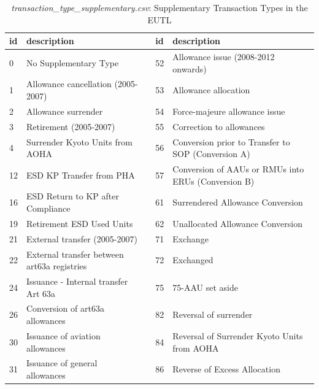 \documentclass[authoryear]{elsarticle}
\begin{document}
\begin{table}[htbp]\scriptsize
	\caption{\textit{transaction\_type\_supplementary.csv}: Supplementary Transaction Types in the EUTL}\label{tab:transTypesSup}
	\centering
	\begin{tabular*}{\textwidth}{@{}@{\extracolsep{\fill}} lp{4cm}clp{3cm} @{}}
		\toprule
		\toprule
		\textbf{id} & \textbf{description} &       & \multicolumn{1}{l}{\textbf{id}} & \multicolumn{1}{l}{\textbf{description}} \\
		\midrule
		0     & No Supplementary Type &       & 52    & \multicolumn{1}{l}{Allowance issue (2008-2012 onwards)} \\
		1     & Allowance cancellation (2005-2007) &       & 53    & \multicolumn{1}{l}{Allowance allocation} \\
		2     & Allowance surrender &       & 54    & \multicolumn{1}{l}{Force-majeure allowance issue} \\
		3     & Retirement (2005-2007) &       & 55    & \multicolumn{1}{l}{Correction to allowances} \\
		4     & Surrender Kyoto Units from AOHA &       & 56    & \multicolumn{1}{l}{Conversion prior to Transfer to SOP (Conversion A)} \\
		12    & ESD KP Transfer from PHA &       & 57    & \multicolumn{1}{l}{Conversion of AAUs or RMUs into ERUs (Conversion B)} \\
		16    & ESD Return to KP after Compliance &       & 61    & \multicolumn{1}{l}{Surrendered Allowance Conversion} \\
		19    & Retirement ESD Used Units &       & 62    & \multicolumn{1}{l}{Unallocated Allowance Conversion} \\
		21    & External transfer (2005-2007) &       & 71    & \multicolumn{1}{l}{Exchange} \\
		22    & External transfer between art63a registries &       & 72    & \multicolumn{1}{l}{Exchanged} \\
		24    & Issuance - Internal transfer Art 63a &       & 75    & \multicolumn{1}{l}{75-AAU set aside} \\
		26    & Conversion of art63a allowances &       & 82    & \multicolumn{1}{l}{Reversal of surrender} \\
		30    & Issuance of aviation allowances &       & 84    & \multicolumn{1}{l}{Reversal of Surrender Kyoto Units from AOHA} \\
		31    & Issuance of general allowances &       & 86    & \multicolumn{1}{l}{Reverse of Excess Allocation} \\

\end{tabular*}
\end{table}
\end{document}
